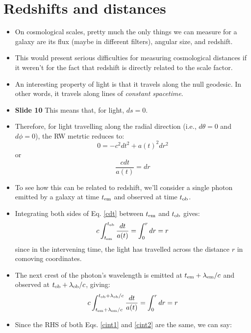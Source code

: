 \documentclass[11pt]{article}
\begin{document}
\section{Redshifts and distances}
\begin{itemize}
\item On cosmological scales, pretty much the only things we can measure for a galaxy are its flux (maybe in different filters), angular size, and redshift.
\item This would present serious difficulties for measuring cosmological distances if it weren't for the fact that redshift is directly related to the scale factor.
\item An interesting property of light is that it travels along the null geodesic. In other words, it travels along lines of {\it constant spacetime}.
\item {\bf Slide 10} This means that, for light, $ds = 0$.
\item Therefore, for light travelling along the radial direction (i.e., $d\theta=0$ and $d\phi=0$), the RW metrtic reduces to:
\begin{equation}
    0 = -c^2dt^2+a(t)^2dr^2
\end{equation}
or
\begin{equation}
    \label{cdt}
    \frac{cdt}{a(t)}=dr 
\end{equation}
\item To see how this can be related to redshift, we'll consider a single photon emitted by a galaxy at time $t_{\rm em}$ and observed at time $t_{\rm ob}$.
\item Integrating both sides of Eq. \ref{cdt} between $t_{\rm em}$ and $t_{\rm ob}$ gives:
\begin{equation}
    \label{cint1}
    c\int_{t_{\rm em}}^{t_{\rm ob}}\frac{dt}{a(t)}=\int_0^r dr=r
\end{equation}
since in the intervening time, the light has travelled across the distance $r$ in comoving coordinates.
\item The next crest of the photon's wavelength is emitted at $t_{\rm em}+\lambda_{\rm em}/c$ and observed at $t_{\rm ob}+\lambda_{\rm ob}/c$, giving:
\begin{equation}
    \label{cint2}
    c\int_{t_{\rm em}+\lambda_{\rm em}/c}^{t_{\rm ob}+\lambda_{\rm ob}/c}\frac{dt}{a(t)}=\int_0^r dr=r
\end{equation}
\item Since the RHS of both Eqs. \ref{cint1} and \ref{cint2} are the same, we can say:
\begin{equation}

\end{equation}
\end{itemize}
\end{document}

